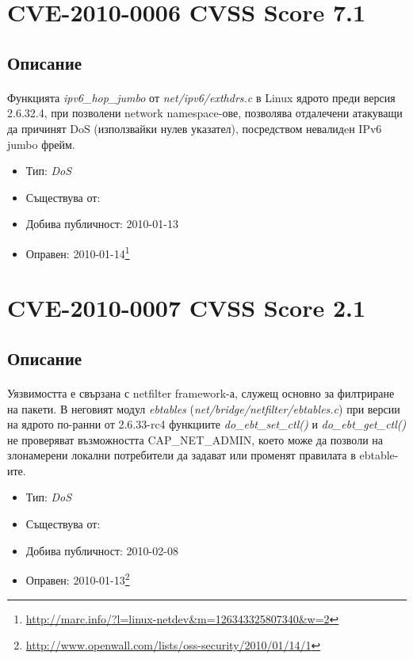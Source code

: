 \documentclass[a4paper,12pt,leqno]{article}
\begin{document}
\section{CVE-2010-0006 CVSS Score 7.1}
\subsection{Описание}
\paragraph{}
Функцията \textit{ipv6\_hop\_jumbo} от \textit{net/ipv6/exthdrs.c} в Linux ядрото преди версия 
2.6.32.4, при  позволени network namespace-ове, позволява отдалечени 
атакуващи да причинят DoS (използвайки нулев указател), посредством 
невалидeн IPv6 jumbo фрейм.

\begin{itemize}
    \item Тип: \textit{DoS}
    \item Съществува от:
  	\item Добива публичност: 2010-01-13
    \item Оправен: 2010-01-14\footnote{\url{http://marc.info/?l=linux-netdev&m=126343325807340&w=2}}
\end{itemize}

\section{CVE-2010-0007 CVSS Score 2.1}
\subsection{Описание}
\paragraph{}
Уязвимостта е свързана с netfilter framework-а, служещ основно за филтриране 
на пакети. В неговият модул \textit{ebtables} (\textit{net/bridge/netfilter/ebtables.c}) при версии 
на ядрото по-ранни от 2.6.33-rc4 функциите \textit{do\_ebt\_set\_ctl()} и 
\textit{do\_ebt\_get\_ctl()} не проверяват възможността CAP\_NET\_ADMIN, което може 
да позволи на злонамерени локални потребители да задават или променят 
правилата в ebtable-ите.
\begin{itemize}
    \item Тип: \textit{DoS}
    \item Съществува от:
  	\item Добива публичност: 2010-02-08
    \item Оправен: 2010-01-13\footnote{\url{http://www.openwall.com/lists/oss-security/2010/01/14/1}}
\end{itemize}
\end{document}
